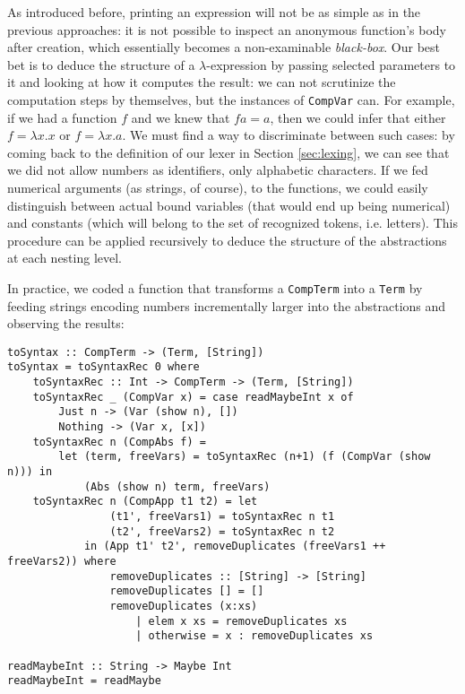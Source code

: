 \documentclass{article}
\begin{document}
As introduced before, printing an expression will not be as simple as in the previous approaches: it is not possible to inspect an anonymous function's body after creation, which essentially becomes a non-examinable \textit{black-box}. Our best bet is to deduce the structure of a $\lambda$-expression by passing selected parameters to it and looking at how it computes the result: we can not scrutinize the computation steps by themselves, but the instances of \lstinline|CompVar| can. For example, if we had a function $f$ and we knew that $f a = a$, then we could infer that either $f = \lambda x . x$ or $f = \lambda x . a$. We must find a way to discriminate between such cases: by coming back to the definition of our lexer in Section \ref{sec:lexing}, we can see that we did not allow numbers as identifiers, only alphabetic characters. If we fed numerical arguments (as strings, of course), to the functions, we could easily distinguish between actual bound variables (that would end up being numerical) and constants (which will belong to the set of recognized tokens, i.e. letters). This procedure can be applied recursively to deduce the structure of the abstractions at each nesting level.

In practice, we coded a function that transforms a \lstinline|CompTerm| into a \lstinline|Term| by feeding strings encoding numbers incrementally larger into the abstractions and observing the results:

\begin{lstlisting}
toSyntax :: CompTerm -> (Term, [String])
toSyntax = toSyntaxRec 0 where
    toSyntaxRec :: Int -> CompTerm -> (Term, [String])
    toSyntaxRec _ (CompVar x) = case readMaybeInt x of
        Just n -> (Var (show n), [])
        Nothing -> (Var x, [x])
    toSyntaxRec n (CompAbs f) =
        let (term, freeVars) = toSyntaxRec (n+1) (f (CompVar (show n))) in
            (Abs (show n) term, freeVars)
    toSyntaxRec n (CompApp t1 t2) = let
                (t1', freeVars1) = toSyntaxRec n t1
                (t2', freeVars2) = toSyntaxRec n t2
            in (App t1' t2', removeDuplicates (freeVars1 ++ freeVars2)) where
                removeDuplicates :: [String] -> [String]
                removeDuplicates [] = []
                removeDuplicates (x:xs)
                    | elem x xs = removeDuplicates xs
                    | otherwise = x : removeDuplicates xs

readMaybeInt :: String -> Maybe Int
readMaybeInt = readMaybe
\end{lstlisting}
\end{document}
